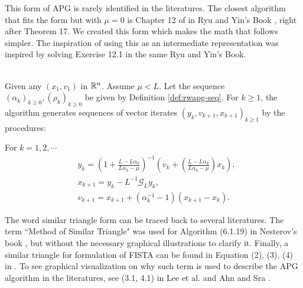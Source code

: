 \documentclass[12pt]{article}
\begin{document}
        \begin{remark}
            This form of APG is rarely identified in the literatures. 
            The closest algorithm that fits the form but with $\mu = 0$ is Chapter 12 of 
            in Ryu and Yin's Book \cite{ryu_large-scale_2022}, right after Theorem 17. 
            We created this form which makes the math that follows simpler. 
            The inspiration of using this as an intermediate representation was inspired by solving Exercise 12.1 in the same Ryu and Yin's Book. 
        \end{remark}
        \begin{definition}\label{def:r-wapg-st-form} \; \\
            Given any $(x_1, v_1)$ in $\mathbb R^n$. 
            Assume $\mu < L$.
            Let the sequence $(\alpha_k)_{k \ge 0}, (\rho_k)_{k\ge 0}$ be given by Definition \ref{def:rwapg-seq}. 
            For $k \ge 1$, the algorithm generates sequences of vector iterates $(y_k, v_{k + 1}, x_{k + 1})_{k \ge 1}$ by the procedures: 
            \begin{tcolorbox}
                For $k=1, 2, \cdots $
                \begin{align*}
                    & y_k = 
                    \left(
                        1 + \frac{L - L\alpha_k}{L\alpha_k - \mu}
                    \right)^{-1}
                    \left(
                        v_k + 
                        \left(\frac{L - L\alpha_k}{L\alpha_k - \mu} \right) x_k
                    \right), 
                    \\
                    & x_{k + 1} = 
                    y_k - L^{-1} \mathcal G_L y_k, 
                    \\
                    & v_{k + 1} = 
                    x_{k + 1} + (\alpha_k^{-1} -1)(x_{k + 1} - x_k). 
                \end{align*}    
            \end{tcolorbox}
        \end{definition}
        \begin{remark}
            The word similar triangle form can be traced back to several literatures. 
            The term ``Method of Similar Triangle" was used for Algorithm (6.1.19) in Nesterov's book \cite{nesterov_lectures_2018}, but without the necessary graphical illustrations to clarify it. 
            Finally, a similar triangle for formulation of FISTA can be found in Equation (2), (3), (4) in \cite{chambolle_convergence_2015}. 
            To see graphical visualization on why such term is used to describe the APG algorithm in the literatures, see 
            (3.1, 4.1) in Lee et al. \cite{lee_geometric_2021} and Ahn and Sra \cite{ahn_understanding_2022}. 
        \end{remark}
\end{document}
